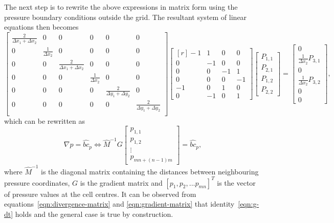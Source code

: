 \documentclass{article}
\begin{document}
The next step is to rewrite the above expressions in matrix form using the pressure boundary conditions outside the grid. The resultant system of linear equations then becomes
\begin{equation}\label{eqn:gradient-matrix}
	\begin{bmatrix}{}
		\frac{2}{\Delta x_1 + \Delta x_2}	&0	&0	&0	&0	&0	\\
		0	&\frac{1}{\Delta x_2}	&0	&0	&0	&0	\\
		0	&0	&\frac{2}{\Delta x_1 + \Delta x_2}	&0	&0	&0	\\
		0	&0	&0	&\frac{1}{\Delta x_2}	&0	&0	\\
		0	&0	&0	&0	&\frac{2}{\Delta y_1 + \Delta y_2}	&0	\\
		0	&0	&0	&0	&0	&\frac{2}{\Delta y_1 + \Delta y_2}\\
	\end{bmatrix}
	\begin{bmatrix*}[r]
	-1 & 1 & 0 & 0 \\
	0 & -1 & 0 & 0 \\
	0 & 0 & -1 & 1 \\
	0 & 0 & 0 & -1 \\
	-1 & 0 & 1 & 0 \\
	0 & -1 & 0 & 1
	\end{bmatrix*}
	\begin{bmatrix}{}
  		P_{1,1} \\
	  	P_{2,1} \\
		P_{1,2} \\
		P_{2,2}
	\end{bmatrix}
	=
	\begin{bmatrix}{}
		0\\
		\frac{1}{\Delta x_2}P_{3,1}\\
		0\\
		\frac{1}{\Delta x_2}P_{3,2}\\
		0\\
		0
	\end{bmatrix},
\end{equation}
which can be rewritten as
\begin{equation}
	\nabla p = \hat{bc}_p\iff
	\hat{M}^{-1}{G} 
	\begin{bmatrix}{}
  		p_{1,1} \\
	  	p_{1,2} \\
	  	\vdots \\
	  	p_{mn+(n-1)m}
	\end{bmatrix}
=\hat{bc}_p,
\end{equation}
where $\hat{M}^{-1}$ is the diagonal matrix containing the distances between neighbouring pressure coordinates, ${G}$ is the gradient matrix and $[p_1,p_2,...p_{mn}]^T$ is the vector of pressure values at the cell centres. It can be observed from equations~\eqref{eqn:divergence-matrix} and \eqref{eqn:gradient-matrix} that identity~\eqref{eqn:g-dt} holds and the general case is true by construction.
\end{document}
